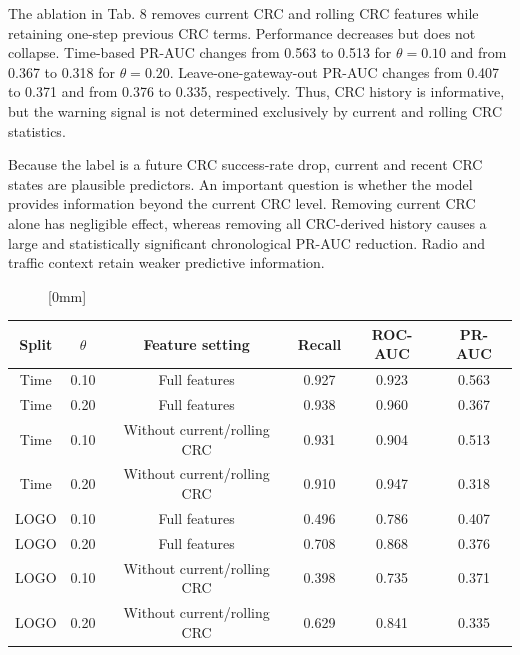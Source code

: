\documentclass{jot}
\begin{document}
The ablation in Tab. 8 removes current CRC and rolling CRC features while retaining one-step previous CRC terms. Performance decreases but does not collapse. Time-based PR-AUC changes from 0.563 to 0.513 for $\theta = 0.10$ and from 0.367 to 0.318 for $\theta = 0.20$. Leave-one-gateway-out PR-AUC changes from 0.407 to 0.371 and from 0.376 to 0.335, respectively. Thus, CRC history is informative, but the warning signal is not determined exclusively by current and rolling CRC statistics.

Because the label is a future CRC success-rate drop, current and recent CRC states are plausible predictors. An important question is whether the model provides information beyond the current CRC level. Removing current CRC alone has negligible effect, whereas removing all CRC-derived history causes a large and statistically significant chronological PR-AUC reduction. Radio and traffic context retain weaker predictive information.

\begin{figure}[t]
[0mm]
\end{figure}

\begin{table}[t]
\centering
\begin{tabular}{@{}cccccc@{}}
\toprule
Split & $\theta$ & Feature setting & Recall & ROC-AUC & PR-AUC \\
\midrule
Time & 0.10 & Full features & 0.927 & 0.923 & 0.563 \\
Time & 0.20 & Full features & 0.938 & 0.960 & 0.367 \\
Time & 0.10 & Without current/rolling CRC & 0.931 & 0.904 & 0.513 \\
Time & 0.20 & Without current/rolling CRC & 0.910 & 0.947 & 0.318 \\
LOGO & 0.10 & Full features & 0.496 & 0.786 & 0.407 \\
LOGO & 0.20 & Full features & 0.708 & 0.868 & 0.376 \\
LOGO & 0.10 & Without current/rolling CRC & 0.398 & 0.735 & 0.371 \\
LOGO & 0.20 & Without current/rolling CRC & 0.629 & 0.841 & 0.335 \\
\bottomrule
\end{tabular}
\end{table}
\end{document}
